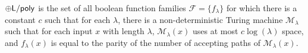 %
%
\begin{definition}[$\lpoly$]
$\lpoly$ is the set of all boolean function families $\mathcal{F} = \{f_{\lambda}\}$ for which there is a constant $c$ such that for each $\lambda$, there is a non-deterministic Turing machine $\mathcal M_{\lambda}$ such that for each input $x$ with length $\lambda$, $\mathcal M_{\lambda}(x)$ uses at most $c\log(\lambda)$ space, and $f_{\lambda}(x)$ is equal to the parity of the number of accepting paths of $\mathcal M_{\lambda}(x)$.
\end{definition}

